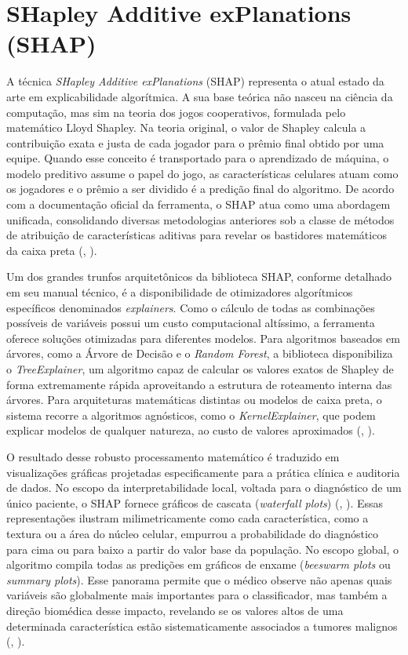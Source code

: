 \documentclass[
    12pt
    ,oneside
    ,a4paper
    ,chapter=TITLE
    ,section=TITLE
    ,sumario=abnt-6027-2012
    ,english,brazil]{abntex2} %
\begin{document}
\section{SHapley Additive exPlanations (SHAP)}
\label{sec:shap}

A técnica \textit{SHapley Additive exPlanations} (SHAP) representa o atual estado da arte em explicabilidade algorítmica. A sua base teórica não nasceu na ciência da computação, mas sim na teoria dos jogos cooperativos, formulada pelo matemático Lloyd Shapley. Na teoria original, o valor de Shapley calcula a contribuição exata e justa de cada jogador para o prêmio final obtido por uma equipe. Quando esse conceito é transportado para o aprendizado de máquina, o modelo preditivo assume o papel do jogo, as características celulares atuam como os jogadores e o prêmio a ser dividido é a predição final do algoritmo. De acordo com a documentação oficial da ferramenta, o SHAP atua como uma abordagem unificada, consolidando diversas metodologias anteriores sob a classe de métodos de atribuição de características aditivas para revelar os bastidores matemáticos da caixa preta (, \citeyear{Lundberg2017}).

Um dos grandes trunfos arquitetônicos da biblioteca SHAP, conforme detalhado em seu manual técnico, é a disponibilidade de otimizadores algorítmicos específicos denominados \textit{explainers}. Como o cálculo de todas as combinações possíveis de variáveis possui um custo computacional altíssimo, a ferramenta oferece soluções otimizadas para diferentes modelos. Para algoritmos baseados em árvores, como a Árvore de Decisão e o \textit{Random Forest}, a biblioteca disponibiliza o \textit{TreeExplainer}, um algoritmo capaz de calcular os valores exatos de Shapley de forma extremamente rápida aproveitando a estrutura de roteamento interna das árvores. Para arquiteturas matemáticas distintas ou modelos de caixa preta, o sistema recorre a algoritmos agnósticos, como o \textit{KernelExplainer}, que podem explicar modelos de qualquer natureza, ao custo de valores aproximados (, \citeyear{SHAPDocs2026}).

O resultado desse robusto processamento matemático é traduzido em visualizações gráficas projetadas especificamente para a prática clínica e auditoria de dados. No escopo da interpretabilidade local, voltada para o diagnóstico de um único paciente, o SHAP fornece gráficos de cascata (\textit{waterfall plots}) (, \citeyear{dutta2024}). Essas representações ilustram milimetricamente como cada característica, como a textura ou a área do núcleo celular, empurrou a probabilidade do diagnóstico para cima ou para baixo a partir do valor base da população. No escopo global, o algoritmo compila todas as predições em gráficos de enxame (\textit{beeswarm plots} ou \textit{summary plots}). Esse panorama permite que o médico observe não apenas quais variáveis são globalmente mais importantes para o classificador, mas também a direção biomédica desse impacto, revelando se os valores altos de uma determinada característica estão sistematicamente associados a tumores malignos (, \citeyear{Adadi2018}).
\end{document}

